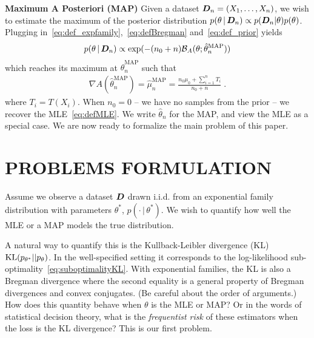 \documentclass[twoside]{article}
\let\oldsection\section
\renewcommand{\section}[1]{\oldsection{\texorpdfstring{\uppercase{#1}}{#1}}}
\newcommand{\cond}{\,\vert\,}
\newcommand{\logpart}{A}
\newcommand{\bregman}{\cB_\logpart}
\newcommand{\bregmanconj}{\cB_{\logpart^*}}
\newcommand{\nat}{\theta}
\newcommand{\m}{\mu}
\newcommand{\meanp}{\m}
\newcommand{\MAPm}{\hat \m_n}
\newcommand{\MAPt}{\hat \nat_n}
\begin{document}
{\bf Maximum A Posteriori (MAP)}
Given a dataset ${\bm{D}}_n =(X_1,\dots,X_n)$, we wish to estimate the maximum of the posterior distribution $p(\nat \cond \mD_n) \propto p(\mD_n|\nat)p(\nat)$.
Plugging in~\eqref{eq:def_expfamily},~\eqref{eq:defBregman} and~\eqref{eq:def_prior} yields
\begin{align}
	p(\nat \cond \mD_n)
    \propto \exp(- (n_0+n) \bregman(\nat; \MAPt^\text{MAP}))
    \label{eq:joint_likelihood}
\end{align}
which reaches its maximum at $\MAPt^\text{MAP}$ such that
\begin{align}
    \nabla \logpart(\MAPt^\text{MAP}) = \MAPm^\text{MAP}
    = \frac{n_0 \meanp_0 + \sum_{i=1}^n T_i}{n_0+n} \; .
    \label{eq:defMAP}
\end{align}
where $T_i=T(X_i)$.
When $n_0=0$ -- we have no samples from the prior -- we recover the MLE~\eqref{eq:defMLE}.
We write $\MAPt$ for the MAP, and view the MLE as a special case.
We are now ready to formalize the main problem of this paper.

\section{PROBLEMS FORMULATION}
\label{sec:problem}

Assume we observe a dataset ${\bm{D}}$ drawn i.i.d. from an exponential family distribution
with parameters $\nat^*$, $p(\cdot \cond\nat^*)$.
We wish to quantify how well the MLE or a MAP models the true distribution.

A natural way to quantify this is the Kullback-Leibler divergence (KL) $\KL(p_{\nat^*} || p_\nat)$. %
In the well-specified setting it corresponds to the log-likelihood sub-optimality~\eqref{eq:suboptimalityKL}.
With exponential families, the KL is also a Bregman divergence
\alignn{
	\KL(p_{\nat^*} || p_\nat)
	 = \bregman(\nat ; \nat^*)
	 = \bregmanconj(\m^* ; \m) \; .
}
where the second equality is a general property of Bregman divergences and convex conjugates. (Be careful about the order of arguments.)
How does this quantity behave when $\nat$ is the MLE or MAP?
 Or in the words of statistical decision theory, what is the \emph{frequentist risk} of these estimators when the loss is the KL divergence? 
This is our first problem.
\end{document}
